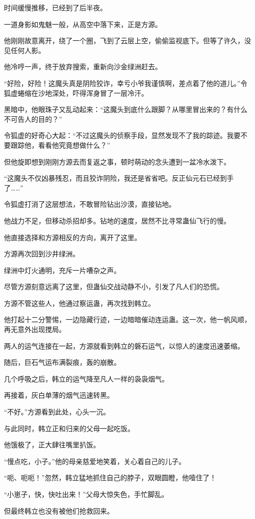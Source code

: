\begin{this_body}
时间缓慢推移，已经到了后半夜。

一道身影如鬼魅一般，从高空中落下来，正是方源。

他刚刚故意离开，绕了一个圈，飞到了云层上空，偷偷监视底下。但等了许久，没见任何人影。

他冷哼一声，终于放弃搜索，重新向沙金绿洲赶去。

“好险，好险！这魔头真是阴险狡诈，幸亏小爷我谨慎啊，差点着了他的道儿。”令狐虚蜷缩在沙地深处，吓得浑身冒了一层冷汗。

黑暗中，他眼珠子又乱动起来：“这魔头到底什么跟脚？从哪里冒出来的？有什么不可告人的目的？”

令狐虚的好奇心大起：“不过这魔头的侦察手段，显然发现不了我的踪迹。我要不要跟踪他，看看他究竟想做什么？”

但他旋即想到刚刚方源去而复返之事，顿时萌动的念头遭到一盆冷水泼下。

“这魔头不仅凶暴残忍，而且狡诈阴险，我还是省省吧。反正仙元石已经到手了……”

令狐虚打消了这层想法，不敢冒险钻出沙漠，直接钻地。

他战力不足，但移动杀招却多。钻地的速度，居然不比寻常蛊仙飞行的慢。

他直接选择和方源相反的方向，离开了这里。

方源再次回到沙井绿洲。

绿洲中灯火通明，充斥一片嘈杂之声。

尽管方源刻意远离了这里，但蛊仙交战动静不小，引发了凡人们的恐慌。

方源不管这些人，他通过察运蛊，再次找到韩立。

他打起十二分警惕，一边隐藏行迹，一边暗暗催动连运蛊。这一次，他一帆风顺，再无意外出现搅局。

两人的运气连接在一起，方源就看到韩立的磐石运气，以惊人的速度迅速萎缩。

随后，巨石气运布满裂痕，轰的崩散。

几个呼吸之后，韩立的运气降至凡人一样的袅袅烟气。

再接着，灰白单薄的烟气迅速转黑。

“不好。”方源看到此处，心头一沉。

与此同时，韩立正和归来的父母一起吃饭。

他饿极了，正大肆往嘴里扒饭。

“慢点吃，小子。”他的母亲慈爱地笑着，关心着自己的儿子。

“呃、呃呃！”忽然，韩立猛地抓住自己的脖子，双眼圆瞪，他噎住了！

“小崽子，快，快吐出来！”父母大惊失色，手忙脚乱。

但最终韩立也没有被他们抢救回来。

\end{this_body}

